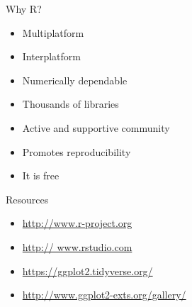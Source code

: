 \documentclass{beamer}
\begin{document}
\begin{frame}{Why R?}
	\begin{itemize}
		\item Multiplatform
		\item Interplatform
		\item Numerically dependable
		\item Thousands of libraries
		\item Active and supportive community
		\item Promotes reproducibility
		\item It is free
	\end{itemize}
\end{frame}

\begin{frame}{Resources}
	\begin{itemize}
		\item \url{http://www.r-project.org}
		\item \url{http://	www.rstudio.com}
		\item \url{https://ggplot2.tidyverse.org/}
		\item \url{http://www.ggplot2-exts.org/gallery/}
	\end{itemize}
	
\end{frame}
\end{document}
